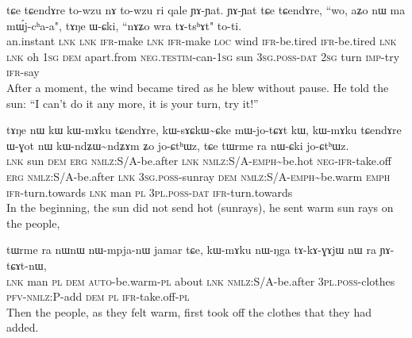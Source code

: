 \documentclass[oneside,a4paper,11pt]{article}
\newcommand{\ipab}[1]{{\phon#1}}
\newcommand{\tld}{\textasciitilde{}}
\begin{document}
\begin{exe} 
 \ex 
\gll   \ipab{toʁde} \ipab{tɕe} \ipab{tɕendɤre} \ipab{to-wzu} \ipab{nɤ} \ipab{to-wzu} \ipab{ri} \ipab{qale}  \ipab{ɲɤ-ɲat.} \ipab{ɲɤ-ɲat} \ipab{tɕe} \ipab{tɕendɤre,} \ipab{``wo,} \ipab{aʑo} \ipab{nɯ} \ipab{ma} \ipab{mɯ́j-cʰa-a",} \ipab{tɤŋe} \ipab{ɯ-ɕki,} \ipab{``nɤʑo} \ipab{wra} \ipab{tɤ-tsʰɤt"} \ipab{to-ti.} \\
  an.instant \textsc{lnk} \textsc{lnk}  \textsc{ifr}-make \textsc{lnk} \textsc{ifr}-make \textsc{loc} wind  \textsc{ifr}-be.tired \textsc{ifr}-be.tired \textsc{lnk} \textsc{lnk}   oh     1\textsc{sg} \textsc{dem} apart.from \textsc{neg}.\textsc{testim}-can-1\textsc{sg} sun  3\textsc{sg}.\textsc{poss}-\textsc{dat} 2\textsc{sg}    turn \textsc{imp}-try     \textsc{ifr}-say\\
 \glt  After a moment, the wind became tired as he blew without pause. He told the sun: ``I can't do it any more, it is your turn, try it!''
\end{exe} 

 

\begin{exe} 
 \ex 
\gll   \ipab{tɕe} \ipab{tɤŋe} \ipab{nɯ} \ipab{kɯ} \ipab{kɯ-mɤku} \ipab{tɕendɤre,} \ipab{kɯ-sɤɕkɯ\tld{}ɕke} \ipab{mɯ-jo-tɕɤt} \ipab{kɯ,} \ipab{kɯ-mɤku} \ipab{tɕendɤre} \ipab{ɯ-ɣot} \ipab{nɯ} \ipab{kɯ-ndʑɯ\tld{}ndʑɤm} \ipab{ʑo} \ipab{jo-ɕtʰɯz,} \ipab{tɕe} \ipab{tɯrme} \ipab{ra} \ipab{nɯ-ɕki} \ipab{jo-ɕtʰɯz.} \\ 
  \textsc{lnk} sun    \textsc{dem} \textsc{erg} \textsc{nmlz}:S/A-be.after  \textsc{lnk}   \textsc{nmlz}:S/A-\textsc{emph}\tld{}be.hot \textsc{neg}-\textsc{ifr}-take.off \textsc{erg} \textsc{nmlz}:S/A-be.after \textsc{lnk}  3\textsc{sg}.\textsc{poss}-sunray  \textsc{dem} \textsc{nmlz}:S/A-\textsc{emph}\tld{}be.warm \textsc{emph} \textsc{ifr}-turn.towards \textsc{lnk} man    \textsc{pl}  3\textsc{pl}.\textsc{poss}-\textsc{dat} \textsc{ifr}-turn.towards\\ 
 \glt  In the beginning, the sun did not send hot (sunrays), he sent warm sun rays on the people,
\end{exe} 

 

\begin{exe} 
 \ex 
\gll  \ipab{tɕendɤre} \ipab{tɯrme} \ipab{ra} \ipab{nɯnɯ} \ipab{nɯ-mpja-nɯ} \ipab{jamar} \ipab{tɕe,} \ipab{kɯ-mɤku}  \ipab{nɯ-ŋga} \ipab{tɤ-kɤ-ɣɤjɯ} \ipab{nɯ} \ipab{ra} \ipab{ɲɤ-tɕɤt-nɯ,} \\ 
 \textsc{lnk}  man    \textsc{pl}  \textsc{dem}   \textsc{auto}-be.warm-\textsc{pl}  about \textsc{lnk}  \textsc{nmlz}:S/A-be.after  3\textsc{pl}.\textsc{poss}-clothes \textsc{pfv}-\textsc{nmlz}:P-add     \textsc{dem} \textsc{pl}  \textsc{ifr}-take.off-\textsc{pl}\\ 
 \glt  Then the people, as they felt warm, first took off the clothes that they had added.
\end{exe} 
\end{document}
